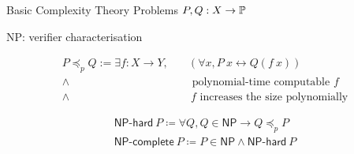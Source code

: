 \documentclass[11pt,usenames,dvipsnames,
hyperref={pdfencoding=auto,psdextra}]{beamer}
\def\showTODOs{}
\newcommand{\TODO}[1]{\ifthenelse{\isundefined{\showTODOs}}{}{\colorbox{red}{\LARGE TODO}:#1}}
\newcommand{\NP}{\textsf{NP}}
\newcommand{\defeq}{\coloneqq}
\newcommand{\redP}{\ensuremath{\preceq_p}}
\begin{document}

\begin{frame}{Basic Complexity Theory}
  Problems $P, Q : X \rightarrow \mathbb{P}$

  \NP{}: verifier characterisation

  \begin{align*}
    P \redP{} Q := \exists f : X \rightarrow Y, \quad&(\forall x, P~x \leftrightarrow Q(f~x)) \\
    \land& \text{ polynomial-time computable } f\\
    \land &~f \text{ increases the size polynomially}
  \end{align*}
  
  \begin{align*}
    \textsf{NP-hard}~P \defeq \forall Q, Q \in \NP{} \rightarrow Q \redP{} P \\
    \textsf{NP-complete}~P \defeq P \in \NP{} \land \textsf{NP-hard}~P 
  \end{align*}
\end{frame}
\end{document}
